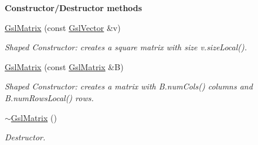 \begin{Indent}{\bf Constructor/\-Destructor methods}
\begin{DoxyCompactItemize}
\hyperlink{class_q_u_e_s_o_1_1_gsl_matrix_a786b09f19e4b2a2f8b43d3e5351eb692}{Gsl\-Matrix} (const \hyperlink{class_q_u_e_s_o_1_1_gsl_vector}{Gsl\-Vector} \&v)
\begin{DoxyCompactList}\small\item\em Shaped Constructor\-: creates a square matrix with size {\ttfamily v.\-size\-Local()}. \end{DoxyCompactList}\item 
\hyperlink{class_q_u_e_s_o_1_1_gsl_matrix_ad588205a8bb02d4285abec2088f46d54}{Gsl\-Matrix} (const \hyperlink{class_q_u_e_s_o_1_1_gsl_matrix}{Gsl\-Matrix} \&B)
\begin{DoxyCompactList}\small\item\em Shaped Constructor\-: creates a matrix with {\ttfamily B.\-num\-Cols()} columns and {\ttfamily B.\-num\-Rows\-Local()} rows. \end{DoxyCompactList}\item 
\hyperlink{class_q_u_e_s_o_1_1_gsl_matrix_a37ff1a0ad9e84629c1d1cda4df1dcae5}{$\sim$\-Gsl\-Matrix} ()
\begin{DoxyCompactList}\small\item\em Destructor. \end{DoxyCompactList}\end{DoxyCompactItemize}
\end{Indent}
